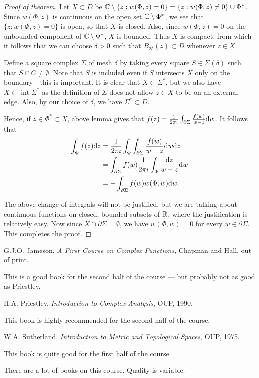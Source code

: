 \documentclass{notes}
\theoremstyle{plain}
\DeclareMathOperator{\inter}{int}
\begin{document}
\begin{proof}[Proof of theorem]
Let $X \subset D$ be $\mathbb{C} \setminus \{ z : w(\Phi,z) = 0 \} = \{ z : w(\Phi,z)
\neq 0\} \cup \Phi^*$.  Since $w(\Phi,z)$ is continuous on the open set
$\mathbb{C} \setminus \Phi^*$, we see that $\{ z : w(\Phi,z) = 0 \}$ is open, so that
$X$ is closed.  Also, since $w(\Phi,z) = 0$ on the unbounded component of
$\mathbb{C} \setminus \Phi^*$, $X$ is bounded.  Thus $X$ is compact, from which it
follows that we can choose $\delta > 0$ such that $B_{2 \delta} (z) \subset D$
whenever $z \in X$.

Define a square complex $\Sigma$ of mesh $\delta$ by taking every square
$S \in \Sigma(\delta)$ such that $S \cap C \neq \emptyset$.  Note that
$S$ is included even if $S$ intersects $X$ only on the boundary - this is 
important.  It is clear that $X \subset \Sigma^*$, but we also have
$X \subset \inter \Sigma^*$ as the definition of $\Sigma$ does not allow
$z \in X$ to be on an external edge.  Also, by our choice of $\delta$, we
have $\Sigma^* \subset D$.

Hence, if $z \in \Phi^* \subset X$, above lemma gives that $f(z) = 
\frac{1}{2 \pi \imath} \int_{\partial \Sigma} \frac{f(w)}{w-z} \mathrm{d} w$.  It follows
that
\begin{align*}
\int_\Phi f(z) \mathrm{d} z &= \frac{1}{2 \pi \imath} \int_\Phi \int_{\partial \Sigma}
\frac{f(w)}{w-z} \mathrm{d} w \mathrm{d} z \\
&= \int_{\partial \Sigma} f(w) \frac{1}{2 \pi \imath} \int_\Phi
\frac{\mathrm{d} z}{w-z} \mathrm{d} w \\
&= - \int_{\partial \Sigma} f(w) w(\Phi,w) \mathrm{d} w.
\end{align*}

The above change of integrals will not be justified, but we are talking about
continuous functions on closed, bounded subsets of $\mathbb{R}$, where the
justification is relatively easy.  Now since $X \cap \partial \Sigma =
\emptyset$, we have $w(\Phi,w) = 0$ for every $w \in \partial \Sigma$.  This
completes the proof.
\end{proof}

\backmatter

\begin{thebibliography}{9}

 G.J.O. Jameson, \emph{A First Course on Complex
    Functions}, Chapman and Hall, out of print.
  
  {\sffamily \small This is a good book for the second half of the
    course --- but probably not as good as Priestley.}

 H.A. Priestley, \emph{Introduction to Complex
    Analysis}, OUP, 1990.
  
  {\sffamily \small This book is highly recommended for the second
    half of the course. }

 W.A. Sutherland, \emph{Introduction to Metric and
    Topological Spaces}, OUP, 1975.

  {\sffamily \small This book is quite good for the first half of the
    course. }

\end{thebibliography}

There are a lot of books on this course.  Quality is variable.

\printindex
\end{document}
